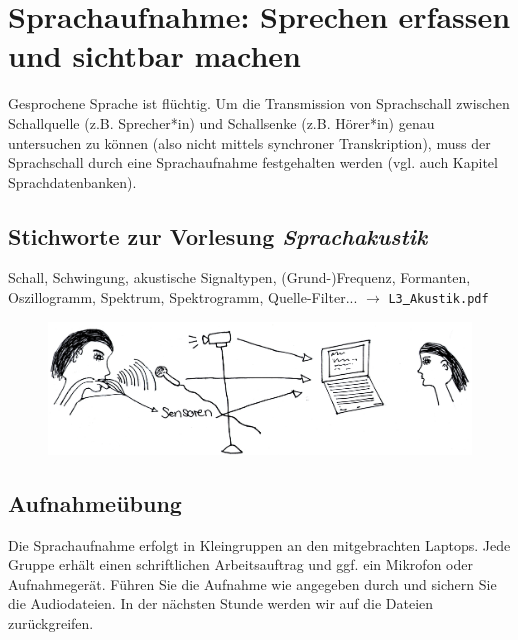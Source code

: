 \documentclass[11pt]{book}
\begin{document}
\vspace*{\fill} 






\chapter{Sprachaufnahme: Sprechen erfassen und sichtbar machen} 

Gesprochene Sprache ist flüchtig. Um die Transmission von Sprachschall zwischen Schallquelle (z.\thinspace B. Sprecher*in) und Schallsenke (z.\thinspace B. Hörer*in) genau untersuchen zu können (also nicht mittels synchroner Transkription), muss der Sprachschall durch eine Sprachaufnahme festgehalten werden (vgl. auch Kapitel Sprachdatenbanken). 

\section{Stichworte zur Vorlesung \em{Sprachakustik}}

Schall, Schwingung, akustische Signaltypen, (Grund-)Frequenz, Formanten, Oszillogramm, Spektrum, Spektrogramm, Quelle-Filter... $\rightarrow$ {\tt L3\underline{\ }Akustik.pdf}
\begin{figure}[htbp]
\begin{center}
\includegraphics[width=\textwidth]{grafiken/sprachaufnahme/sprechen-erfassen}
\label{t2}
\end{center}
\end{figure}

\section{Aufnahmeübung}


Die Sprachaufnahme erfolgt in Kleingruppen an den mitgebrachten Laptops. Jede Gruppe erhält einen schriftlichen Arbeitsauftrag und ggf. ein Mikrofon oder Aufnahmegerät. Führen Sie die Aufnahme wie angegeben durch und sichern Sie die Audiodateien. In der nächsten Stunde werden wir auf die Dateien zurückgreifen.
\vspace*{7cm} 
\end{document}
